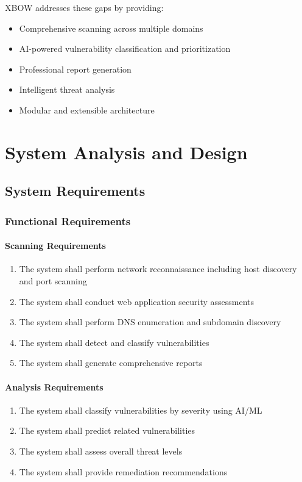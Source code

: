 \documentclass[12pt,a4paper]{report}
\begin{document}
XBOW addresses these gaps by providing:

\begin{itemize}
    \item Comprehensive scanning across multiple domains
    \item AI-powered vulnerability classification and prioritization
    \item Professional report generation
    \item Intelligent threat analysis
    \item Modular and extensible architecture
\end{itemize}

\chapter{System Analysis and Design}

\section{System Requirements}

\subsection{Functional Requirements}

\subsubsection{Scanning Requirements}

\begin{enumerate}
    \item The system shall perform network reconnaissance including host discovery and port scanning
    \item The system shall conduct web application security assessments
    \item The system shall perform DNS enumeration and subdomain discovery
    \item The system shall detect and classify vulnerabilities
    \item The system shall generate comprehensive reports
\end{enumerate}

\subsubsection{Analysis Requirements}

\begin{enumerate}
    \item The system shall classify vulnerabilities by severity using AI/ML
    \item The system shall predict related vulnerabilities
    \item The system shall assess overall threat levels
    \item The system shall provide remediation recommendations
\end{enumerate}
\end{document}
